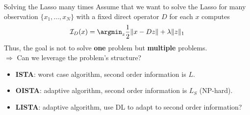 \documentclass{beamer}
\begin{document}
\begin{frame}[t]{Solving the Lasso many times}
    Assume that we want to solve the Lasso for many observation $\{x_1, \dots, x_N\}$ with a fixed direct operator $D$ \ie for each $x$ computes
    \[
        \mathcal I_D(x) = \argmin_z \frac{1}{2}\|x - Dz\| + \lambda\|z\|_1
    \]
    Thus, the goal is not to solve {\bf one} problem but {\bf multiple} problems.\\[1.5em]
{\centering \large{\Large $\Rightarrow$} Can we leverage the problem's structure?\\[2em]}
\begin{itemize}\itemsep1em
    \item {\bf ISTA}: worst case algorithm, second order information is $L$.
    \item {\bf OISTA}: adaptive algorithm, second order information is $L_S$ (NP-hard).
    \item {\bf LISTA}: adaptive algorithm, use DL to adapt to second order information?
\end{itemize}

\end{frame}

\end{document}
